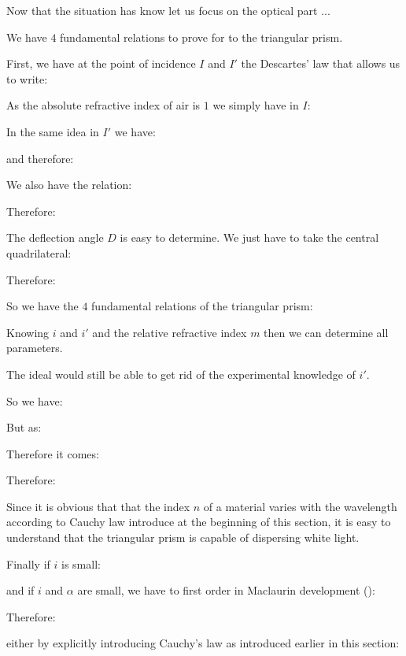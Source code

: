 	Now that the situation has know let us focus on the optical part ...

	We have $4$ fundamental relations to prove for to the triangular prism.

	First, we have at the point of incidence $I$ and $I'$ the Descartes' law that allows us to write:
	
	As the absolute refractive index of air is $1$ we simply have in $I$:
	
	In the same idea in $I'$ we have:
	
	and therefore:
	
	We also have the relation:
	
	Therefore:
	
	The deflection angle $D$ is easy to determine. We just have to take the central quadrilateral:
	
	Therefore:
	
	So we have the $4$ fundamental relations of the triangular prism:
	
	Knowing $i$ and $i'$ and the relative refractive index $m$ then we can determine all parameters.

	The ideal would still be able to get rid of the experimental knowledge of $i'$.

	So we have:
	
	But as:
	
	Therefore it comes:
	
	Therefore:
	
	Since it is obvious that that the index $n$ of a material varies with the wavelength according to Cauchy law introduce at the beginning of this section, it is easy to understand that the triangular prism is capable of dispersing white light.

	Finally if $i$ is small:
	
	and if $i$ and $\alpha$ are small, we have to first order in Maclaurin development ():
	
	Therefore:
	
	either by explicitly introducing Cauchy's law as introduced earlier in this section:
	
	
	\pagebreak
